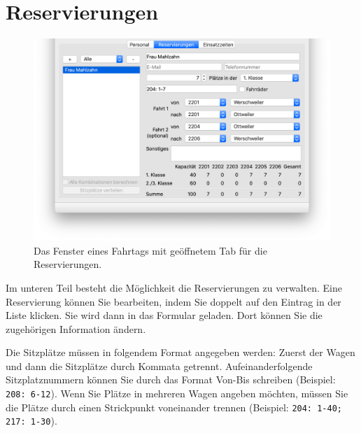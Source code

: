 \section{Reservierungen}
\begin{figure}[!h]
	\includegraphics[width=\textwidth]{img/fahrtag_reservierungen}
	\caption{Das Fenster eines Fahrtags mit geöffnetem Tab für die Reservierungen.}
	\label{fig:einsatz:fahrtag:reservierungen}
\end{figure}
Im unteren Teil besteht die Möglichkeit die Reservierungen zu verwalten.
Eine Reservierung können Sie bearbeiten, indem Sie doppelt auf den Eintrag in der Liste klicken.
Sie wird dann in das Formular geladen. Dort können Sie die zugehörigen Information ändern.


Die Sitzplätze müssen in folgendem Format angegeben werden:
Zuerst der Wagen und dann die Sitzplätze durch Kommata getrennt.
Aufeinanderfolgende Sitzplatznummern können Sie durch das Format Von-Bis schreiben (Beispiel: \texttt{208: 6-12}).
Wenn Sie Plätze in mehreren Wagen angeben möchten,
müssen Sie die Plätze durch einen Strickpunkt voneinander trennen
(Beispiel: \texttt{204: 1-40; 217: 1-30}).


